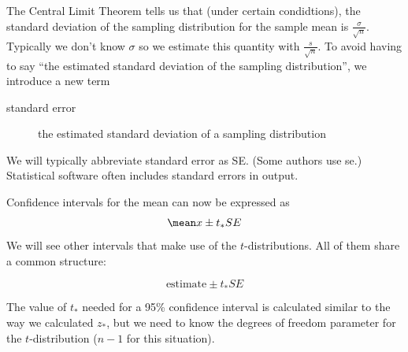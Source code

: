 \documentclass[twoside]{book}\usepackage[]{graphicx}\usepackage[]{xcolor}
\newlength{\tempfmlength}
\newenvironment{fmpage}[1]
     {
	 \medskip
	 \setlength{\tempfmlength}{#1}
	 \begin{lrbox}{\fmbox}
	   \begin{minipage}{#1}
		 \vspace*{.02\tempfmlength}
		 \hfill
	   \begin{minipage}{.95 \tempfmlength}}
		 {\end{minipage}\hfill
		 \vspace*{.015\tempfmlength}
		 \end{minipage}\end{lrbox}\fbox{\usebox{\fmbox}}
	 \medskip
	 }
\newenvironment{boxedText}[1][.98\textwidth]%
{%
\begin{center}
\begin{fmpage}{#1}
}%
{%
\end{fmpage}
\end{center}
}
\begin{document}
The Central Limit Theorem tells us that (under certain condidtions), the standard 
deviation of the sampling distribution for the sample mean is $\frac{\sigma}{\sqrt{n}}$.
Typically we don't know $\sigma$ so we estimate this quantity with 
$\frac{s}{\sqrt{n}}$.
To avoid having to say ``the estimated standard deviation of the sampling distribution'', 
we introduce a new term
\begin{description}
	\item[standard error] the estimated standard deviation of a sampling distribution
\end{description}

We will typically abbreviate standard error as SE. (Some authors use se.)
Statistical software often includes standard errors in output.

Confidence intervals for the mean can now be expressed as 
\[
\mean x \pm t_* SE
\]
We will see other intervals that make use of the $t$-distributions.  All of them
share a common structure:

\begin{boxedText}
		\[
		\mbox{estimate} \pm t_* SE
		\]
\end{boxedText}


The value of $t_*$ needed for a 95\% confidence interval is calculated
similar to the way we calculated $z_*$, but we need to know the degrees 
of freedom parameter for the $t$-distribution ($n-1$ for this situation).
\end{document}
